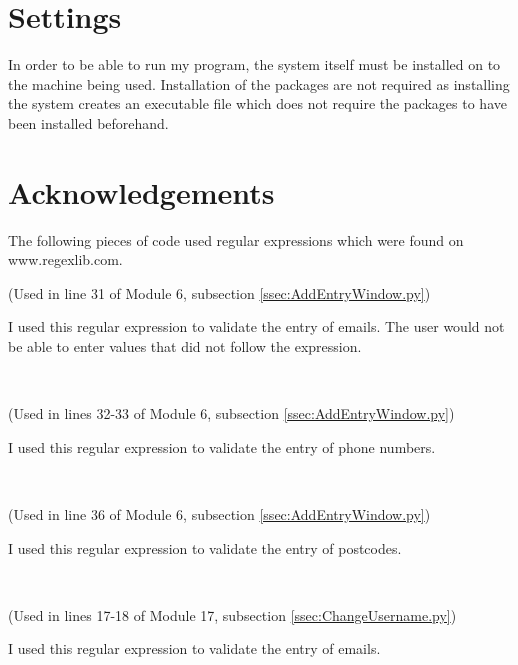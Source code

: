 \section{Settings}

In order to be able to run my program, the system itself must be installed on to the machine being used. Installation of the packages are not required as installing the system creates an executable file which does not require the packages to have been installed beforehand. 

\section{Acknowledgements}
The following pieces of code used regular expressions which were found on www.regexlib.com.
\begin{tiny}
\end{tiny}
(Used in line 31 of Module 6, subsection \ref{ssec:AddEntryWindow.py})

I used this regular expression to validate the entry of emails. The user would not be able to enter values that did not follow the expression.

\

\begin{tiny}
\end{tiny}
(Used in lines 32-33 of Module 6, subsection \ref{ssec:AddEntryWindow.py})

I used this regular expression to validate the entry of phone numbers.

\

\begin{tiny}
\end{tiny}
(Used in line 36 of Module 6, subsection \ref{ssec:AddEntryWindow.py})

I used this regular expression to validate the entry of postcodes.

\

\begin{tiny}
\end{tiny}
(Used in lines 17-18 of Module 17, subsection \ref{ssec:ChangeUsername.py})

I used this regular expression to validate the entry of emails.


